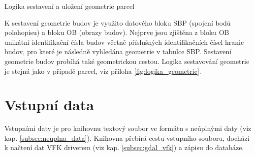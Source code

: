 \begin{algorithm}
\caption{Logika sestavení a uložení geometrie parcel}
\label{alg:sestaveni_parcely}
	\begin{algorithmic}[1]
		\ENDFOR
		\ELSE
		\ENDIF
	\ENDFOR
	\end{algorithmic}
\end{algorithm}

K sestavení geometrie budov je využito datového bloku SBP (spojení
bodů polohopisu) a bloku OB (obrazy budov). Nejprve jsou zjištěna z
bloku OB unikátní identifikační čísla budov včetně příslušných
identifikačních čísel hranic budov, pro které je následně vyhledána
geometrie v tabulce SBP. Sestavení geometrie budov probíhá také
geometrickou cestou. Logika sestavování geometrie je stejná jako v
případě parcel, viz příloha \ref{fig:logika_geometrie}.

\section{Vstupní data}
Vstupními daty je pro knihovnu textový soubor ve formátu  s
neúplnými daty (viz kap. \ref{subsec:neuplna_data}). Knihovna přebírá
cestu vstupního souboru, dochází k načtení dat VFK
driverem (viz kap. \ref{subsec:gdal_vfk}) a zápisu do databáze.

